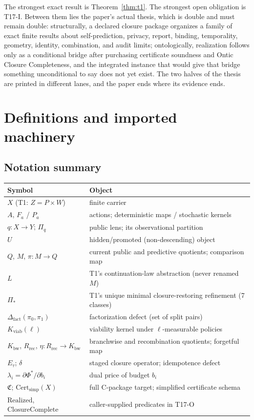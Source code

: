 \documentclass[11pt]{article}
\newcommand{\Kviab}{K_{\mathrm{viab}}}
\newcommand{\Kbw}{K_{\mathrm{bw}}}
\newcommand{\Rrec}{R_{\mathrm{rec}}}
\newcommand{\Cpkg}{\mathfrak{C}}
\newcommand{\Certsimp}{\mathrm{Cert}_{\mathrm{simp}}}
\newcommand{\Dfact}{\Delta_{\mathrm{fact}}}
\theoremstyle{definition}
\begin{document}
The strongest exact result is Theorem~\ref{thm:t1}. The strongest open
obligation is T17-I. Between them lies the paper's actual thesis, which is
double and must remain double: structurally, a declared closure package
organizes a family of exact finite results about self-prediction, privacy,
report, binding, temporality, geometry, identity, combination, and audit
limits; ontologically, realization follows only as a conditional bridge after
purchasing certificate soundness and Ontic Closure Completeness, and the
integrated instance that would give that bridge something unconditional to
say does not yet exist. The two halves of the thesis are printed in different
lanes, and the paper ends where its evidence ends.
 
\appendix
\section{Definitions and imported machinery}
\label{app:imports}


\subsection{Notation summary}

\begin{center}\small
\begin{tabular}{ll}
\toprule
Symbol & Object \\
\midrule
$X$ (T1: $Z = P \times W$) & finite carrier \\
$A$, $F_a$ / $P_a$ & actions; deterministic maps / stochastic kernels \\
$q : X \to Y$; $\Pi_q$ & public lens; its observational partition \\
$U$ & hidden/promoted (non-descending) object \\
$Q$, $M$, $\pi : M \to Q$ & current public and predictive quotients; comparison map \\
$L$ & T1's continuation-law abstraction (never renamed $M$) \\
$\Pi_*$ & T1's unique minimal closure-restoring refinement (7 classes) \\
$\Dfact(\pi_0,\pi_1)$ & factorization defect (set of split pairs) \\
$\Kviab(\ell)$ & viability kernel under $\ell$-measurable policies \\
$\Kbw$, $\Rrec$, $\eta:\Rrec\to\Kbw$ & branchwise and recombination quotients; forgetful map \\
$E_\tau$; $\delta$ & staged closure operator; idempotence defect \\
$\lambda_i = \partial\Phi^*/\partial b_i$ & dual price of budget $b_i$ \\
$\Cpkg$; $\Certsimp(X)$ & full C-package target; simplified certificate schema \\
$\mathrm{Realized}$, $\mathrm{ClosureComplete}$ & caller-supplied predicates in T17-O \\
\bottomrule
\end{tabular}
\end{center}
\end{document}
